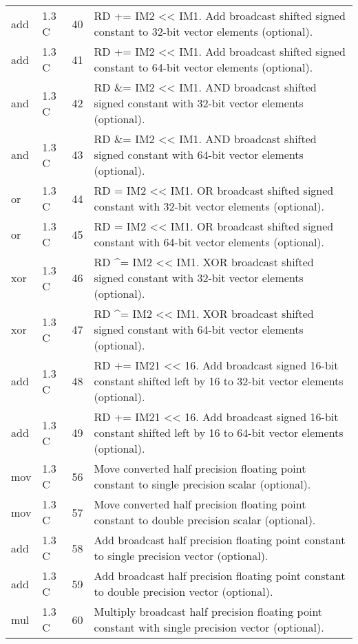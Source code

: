 \documentclass[forwardcom.tex]{subfiles}
\begin{document}
\begin{longtable} {|p{20mm}|p{10mm}|p{8mm}|p{75mm}|}
add           & 1.3 C & 40 & RD += IM2 \textless\textless{} IM1. Add broadcast shifted signed constant to 32-bit vector elements (optional). \\
add           & 1.3 C & 41 & RD += IM2 \textless\textless{} IM1. Add broadcast shifted signed constant to 64-bit vector elements (optional). \\
and           & 1.3 C & 42 & RD \&= IM2 \textless\textless{} IM1. AND broadcast shifted signed constant with 32-bit vector elements (optional). \\
and           & 1.3 C & 43 & RD \&= IM2 \textless\textless{} IM1. AND broadcast shifted signed constant with 64-bit vector elements (optional). \\
or            & 1.3 C & 44 & RD \textbar{}= IM2 \textless\textless{} IM1. OR broadcast shifted signed constant with 32-bit vector elements (optional). \\
or            & 1.3 C & 45 & RD \textbar{}= IM2 \textless\textless{} IM1. OR broadcast shifted signed constant with 64-bit vector elements (optional). \\
xor           & 1.3 C & 46 & RD \^{}= IM2 \textless\textless{} IM1. XOR broadcast shifted signed constant with 32-bit vector elements (optional). \\
xor           & 1.3 C & 47 & RD \^{}= IM2 \textless\textless{} IM1. XOR broadcast shifted signed constant with 64-bit vector elements (optional). \\
add           & 1.3 C & 48 & RD += IM21 \textless\textless{} 16. Add broadcast signed 16-bit constant shifted left by 16 to 32-bit vector elements (optional). \\
add           & 1.3 C & 49 & RD += IM21 \textless\textless{} 16. Add broadcast signed 16-bit constant shifted left by 16 to 64-bit vector elements (optional). \\
mov           & 1.3 C & 56 & Move converted half precision floating point constant to single
precision scalar (optional). \\
mov           & 1.3 C & 57 & Move converted half precision floating point constant to double
precision scalar (optional). \\
add           & 1.3 C & 58 & Add broadcast half precision floating point constant to single
precision vector (optional). \\
add           & 1.3 C & 59 & Add broadcast half precision floating point constant to double
precision vector (optional). \\
mul           & 1.3 C & 60 & Multiply broadcast half precision floating point constant with single precision vector (optional). \\

\end{longtable}
\end{document}
